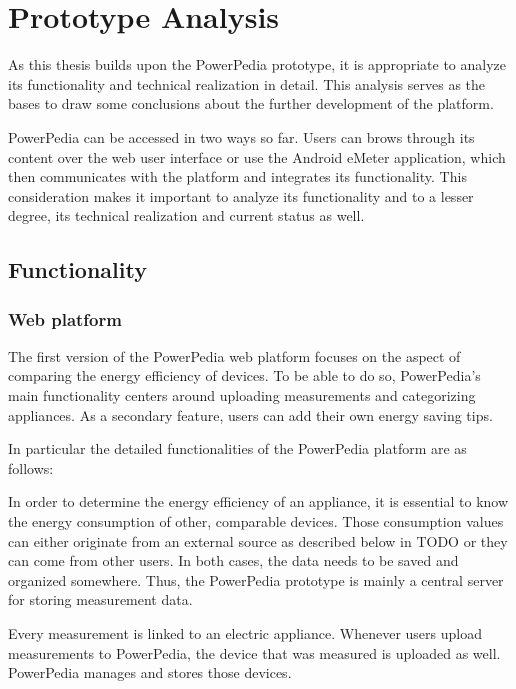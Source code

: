 \section{Prototype Analysis} \label{sec:prototype_analysis}
As this thesis builds upon the PowerPedia prototype, it is appropriate to analyze its functionality and technical realization in detail. This analysis serves as the bases to draw some conclusions about the further development of the platform. 

PowerPedia can be accessed in two ways so far. Users can brows through its content over the web user interface or use the Android eMeter application, which then communicates with the platform and integrates its functionality. This consideration makes it important to analyze its functionality and to a lesser degree, its technical realization and current status as well.
     

\subsection{Functionality}
\subsubsection{Web platform}

The first version of the PowerPedia web platform focuses on the aspect of comparing the energy efficiency of devices. To be able to do so, PowerPedia's main functionality centers around uploading measurements and categorizing appliances. As a secondary feature, users can add their own energy saving tips.  

In particular the detailed functionalities of the PowerPedia platform are as follows:

In order to determine the energy efficiency of an appliance, it is essential to know the energy consumption of other, comparable devices. Those consumption values can either originate from an external source as described below in TODO or they can come from other users. In both cases, the data needs to be saved and organized somewhere. Thus, the PowerPedia prototype is mainly a central server for storing measurement data. 

Every measurement is linked to an electric appliance. Whenever users upload measurements to PowerPedia, the device that was measured is uploaded as well. PowerPedia manages and stores those devices.  


